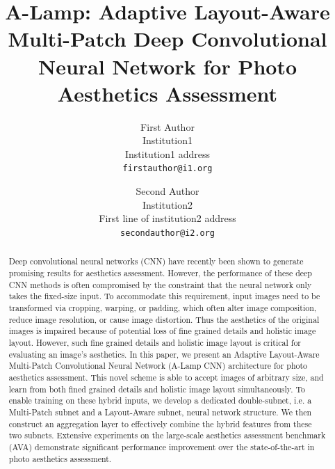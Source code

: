 \documentclass[10pt,twocolumn,letterpaper]{article}
\begin{document}
\title{A-Lamp: Adaptive Layout-Aware Multi-Patch Deep Convolutional Neural Network for Photo Aesthetics Assessment}

\author{First Author\\
Institution1\\
Institution1 address\\
{\tt\small firstauthor@i1.org}
\and
Second Author\\
Institution2\\
First line of institution2 address\\
{\tt\small secondauthor@i2.org}
}

\maketitle
\begin{abstract}	
		
Deep convolutional neural networks (CNN) have recently been shown to generate promising results for aesthetics assessment. However, the performance of these deep CNN methods is often compromised by the constraint that the neural network only takes the fixed-size input. To accommodate this requirement, input images need to be transformed via cropping, warping, or padding, which often alter image composition, reduce image resolution, or cause image distortion. Thus the aesthetics of the original images is impaired because of potential loss of fine grained details and holistic image layout. However, such fine grained details and holistic image layout is critical for evaluating an image's aesthetics. 
In this paper, we present an Adaptive Layout-Aware Multi-Patch Convolutional Neural Network (A-Lamp CNN) architecture for photo aesthetics assessment. This novel scheme is able to accept images of arbitrary size, and learn from both fined grained details and holistic image layout simultaneously. To enable training on these hybrid inputs, we develop a dedicated double-subnet, i.e. a Multi-Patch subnet and a Layout-Aware subnet, neural network structure. We then construct an aggregation layer to effectively combine the hybrid features from these two subnets. Extensive experiments on the large-scale aesthetics assessment benchmark (AVA) demonstrate significant performance improvement over the state-of-the-art in photo aesthetics assessment.

\end{abstract}
\vspace{-3mm}
\end{document}
